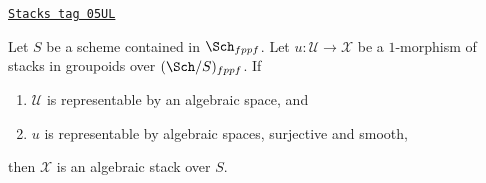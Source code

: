 \begin{lemma}
\label{algebraic-lemma-smooth-surjective-morphism-implies-algebraic}
\href{https://stacks.math.columbia.edu/tag/05UL}{\texttt{Stacks tag 05UL}}

Let $S$ be a scheme contained in $\Sch_{fppf}$.
Let $u : \mathcal{U} \to \mathcal{X}$ be a $1$-morphism of
stacks in groupoids over $(\Sch/S)_{fppf}$. If
\begin{enumerate}
\item $\mathcal{U}$ is representable by an algebraic space, and
\item $u$ is representable by algebraic spaces, surjective and smooth,
\end{enumerate}
then $\mathcal X$ is an algebraic stack over $S$.
\end{lemma}

